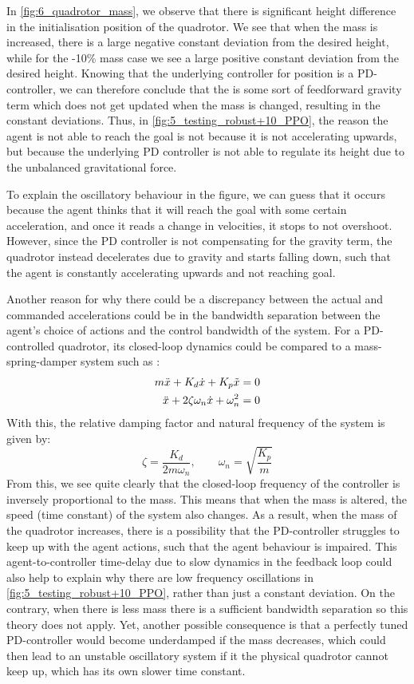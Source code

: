 In \cref{fig:6_quadrotor_mass}, we observe that there is significant height difference in the initialisation position of the quadrotor. We see that when the mass is increased, there is a large negative constant deviation from the desired height, while for the -10\% mass case we see a large positive constant deviation from the desired height.
Knowing that the underlying controller for position is a PD-controller, we can therefore conclude that the is some sort of feedforward gravity term which does not get updated when the mass is changed, resulting in the constant deviations. Thus, in \cref{fig:5_testing_robust+10_PPO}, the reason the agent is not able to reach the goal is not because it is not accelerating upwards, but because the underlying PD controller is not able to regulate its height due to the unbalanced gravitational force.

To explain the oscillatory behaviour in the figure, we can guess that  it occurs because the agent thinks that it will reach the goal with some certain acceleration, and once it reads a change in velocities, it stops to not overshoot. However, since the PD controller is not compensating for the gravity term, the quadrotor instead decelerates due to gravity and starts falling down, such that the agent is constantly accelerating upwards and not reaching goal.

Another reason for why there could be a discrepancy between the actual and commanded accelerations could be in the bandwidth separation between the agent's choice of actions and the control bandwidth of the system. For a PD-controlled quadrotor, its closed-loop dynamics could be compared to a mass-spring-damper system such as \cite{Fossen2021}:
\begin{align}
    m\Ddot{x} + K_d\Dot{x} + K_p\Tilde{x} &= 0 \\
    \Ddot{x} + 2\zeta\omega_n\Dot{x} + \omega_n^2 &= 0
\end{align}
With this, the relative damping factor and natural frequency of the system is given by:
\begin{equation}
    \zeta = \frac{K_d}{2m\omega_n}, \qquad \omega_n = \sqrt{\frac{K_p}{m}}
\end{equation}
From this, we see quite clearly that the closed-loop frequency of the controller is inversely proportional to the mass. This means that when the mass is altered, the speed (time constant) of the system also changes.
As a result, when the mass of the quadrotor increases, there is a possibility that the PD-controller struggles to keep up with the agent actions, such that the agent behaviour is impaired. This agent-to-controller time-delay due to slow dynamics in the feedback loop could also help to explain why there are low frequency oscillations in \cref{fig:5_testing_robust+10_PPO}, rather than just a constant deviation.
On the contrary, when there is less mass there is a sufficient bandwidth separation so this theory does not apply. Yet, another possible consequence is that a perfectly tuned PD-controller would become underdamped if the mass decreases, which could then lead to an unstable oscillatory system if it the physical quadrotor cannot keep up, which has its own slower time constant.
